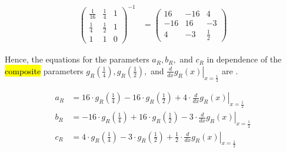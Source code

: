 \begin{align}
	\begin{pmatrix}
		\frac{1}{16} & \frac{1}{4} & 1 \\
		\frac{1}{4}  & \frac{1}{2} & 1 \\
		1            & 1           & 0
	\end{pmatrix}^{-1} & =
	\begin{pmatrix}
		16  & -16 & 4           \\
		-16 & 16  & -3          \\
		4   & -3  & \frac{1}{2}
	\end{pmatrix}
	\label{equ:setup.quad.hyper.matrix}
\end{align}

Hence, the equations for the parameters $a_R, b_R,$ and $c_R$ in dependence of the \hl{composite} parameters $g_R\left(\frac{1}{4}\right), g_R\left(\frac{1}{2}\right),$ and $\left. \frac{d}{dx} g_R\left(x\right) \right|_{x = \frac{1}{2}}$ are .

\begin{align}
	a_R & = 16 \cdot g_R\left(\frac{1}{4}\right) - 16 \cdot g_R\left(\frac{1}{2}\right) + 4 \cdot \left. \frac{d}{dx} g_R\left(x\right) \right|_{x = \frac{1}{2}}     \label{equ:setup.quad.hyper.aR}     \\
	b_R & = -16 \cdot g_R\left(\frac{1}{4}\right) + 16 \cdot g_R\left(\frac{1}{2}\right) - 3 \cdot \left. \frac{d}{dx} g_R\left(x\right) \right|_{x = \frac{1}{2}} \label{equ:setup.quad.hyper.bR}        \\
	c_R & = 4 \cdot g_R\left(\frac{1}{4}\right) - 3 \cdot g_R\left(\frac{1}{2}\right) + \frac{1}{2} \cdot \left. \frac{d}{dx} g_R\left(x\right) \right|_{x = \frac{1}{2}} \label{equ:setup.quad.hyper.cR}
\end{align}

